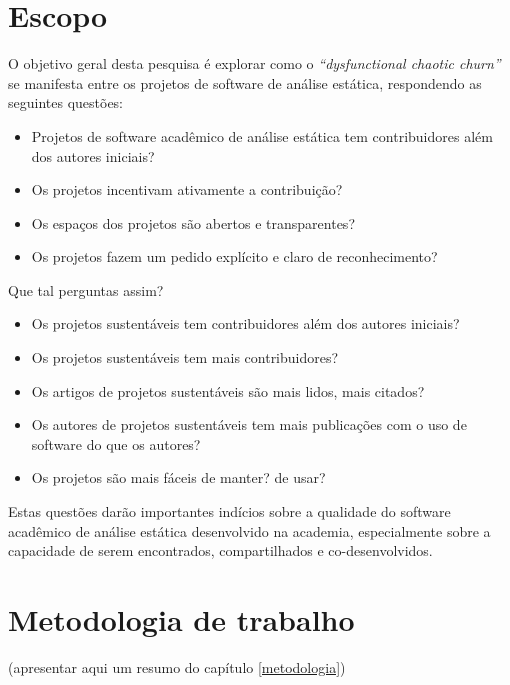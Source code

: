 
\section{Escopo}

O objetivo geral desta pesquisa é explorar como o {\it ``dysfunctional chaotic
churn''} se manifesta entre os projetos de software de análise estática,
respondendo as seguintes questões:

\begin{itemize}
  \item Projetos de software acadêmico de análise estática tem contribuidores além dos autores iniciais?
  \item Os projetos incentivam ativamente a contribuição?
  \item Os espaços dos projetos são abertos e transparentes?
  \item Os projetos fazem um pedido explícito e claro de reconhecimento?
\end{itemize}

Que tal perguntas assim?
\begin{itemize}
  \item Os projetos sustentáveis tem contribuidores além dos autores iniciais?
  \item Os projetos sustentáveis tem mais contribuidores?
  \item Os artigos de projetos sustentáveis são mais lidos, mais citados?
  \item Os autores de projetos sustentáveis tem mais publicações com o uso de software do que os autores?
  \item Os projetos são mais fáceis de manter? de usar? 
\end{itemize}

Estas questões darão importantes indícios sobre a qualidade do software acadêmico de
análise estática desenvolvido na academia, especialmente sobre a capacidade de serem 
encontrados, compartilhados e co-desenvolvidos.

\section{Metodologia de trabalho}

(apresentar aqui um resumo do capítulo \ref{metodologia})


